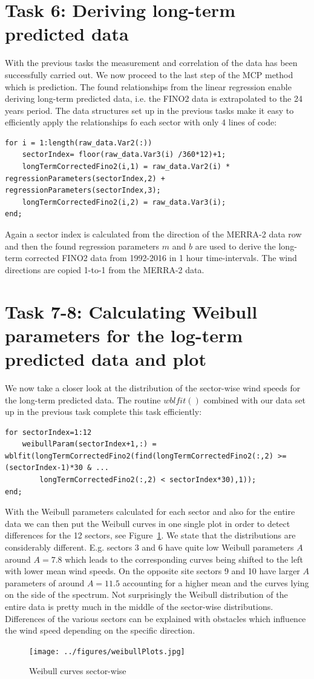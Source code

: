 \documentclass[10pt]{article}
\begin{document}
\section{Task 6: Deriving long-term predicted data}
With the previous tasks the measurement and correlation of the data has been successfully carried out. We now proceed to the last step of the MCP method which is prediction. The found relationships from the linear regression enable deriving long-term predicted data, i.e. the FINO2 data is extrapolated to the 24 years period. The data structures set up in the previous tasks make it easy to efficiently apply the relationships fo each sector with only 4 lines of code:
\begin{lstlisting}
for i = 1:length(raw_data.Var2(:))
    sectorIndex= floor(raw_data.Var3(i) /360*12)+1;
    longTermCorrectedFino2(i,1) = raw_data.Var2(i) * regressionParameters(sectorIndex,2) + regressionParameters(sectorIndex,3);
    longTermCorrectedFino2(i,2) = raw_data.Var3(i);
end;
\end{lstlisting} 
Again a sector index is calculated from the direction of the MERRA-2 data row and then the found regression parameters $m$ and $b$ are used to derive the long-term corrected FINO2 data from 1992-2016 in 1 hour time-intervals. The wind directions are copied 1-to-1 from the MERRA-2 data.

\section{Task 7-8: Calculating Weibull parameters for the log-term predicted data and plot}
We now take a closer look at the distribution of the sector-wise wind speeds for the long-term predicted data. The routine $wblfit()$ combined with our data set up in the previous task complete this task efficiently:
\begin{lstlisting}
for sectorIndex=1:12
    weibullParam(sectorIndex+1,:) = wblfit(longTermCorrectedFino2(find(longTermCorrectedFino2(:,2) >= (sectorIndex-1)*30 & ... 
        longTermCorrectedFino2(:,2) < sectorIndex*30),1));
end;
\end{lstlisting} 

With the Weibull parameters calculated for each sector and also for the entire data we can then put the Weibull curves in one single plot in order to detect differences for the 12 sectors, see Figure~\ref{fig:weibullPlots}. We state that the distributions are considerably different. E.g. sectors 3 and 6 have quite low Weibull parameters $A$ around $A=7.8$ which leads to the corresponding curves being shifted to the left with lower mean wind speeds. On the opposite site sectors 9 and 10 have larger $A$ parameters of around $A=11.5$ accounting for a higher mean and the curves lying on the side of the spectrum. Not surprisingly the Weibull distribution of the entire data is pretty much in the middle of the sector-wise distributions. Differences of the various sectors can be explained with obstacles which influence the wind speed depending on the specific direction.
\begin{figure}
\centering
  \texttt{[image: ../figures/weibullPlots.jpg]}
  \caption{Weibull curves sector-wise}
  \label{fig:weibullPlots}
\end{figure}
\end{document}
